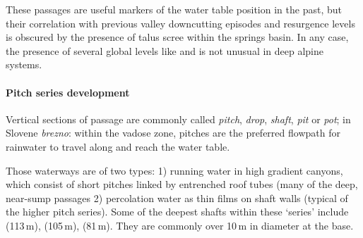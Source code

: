 These passages are useful markers of the water table position in the past, but their correlation with previous valley downcutting episodes and resurgence levels is obscured by the presence of talus scree within the  springs basin. In any case, the presence of several global levels like  and  is not unusual in deep alpine systems. 

 


\paragraph{Pitch series development}
 Vertical sections of passage are commonly called \emph{pitch}, \emph{drop}, \emph{shaft}, \emph{pit} or \emph{pot}; in Slovene \emph{brezno}: within the vadose zone, pitches are the preferred flowpath for rainwater to travel along and reach the water table.

 Those waterways are of two types: 1) running water in high gradient canyons, which consist of short pitches linked by entrenched roof tubes (many of the deep, near-sump passages 2) percolation water as thin films on shaft walls (typical of the higher pitch series). Some of the deepest shafts within these `series' include  (113\,m),  (105\,m),  (81\,m). They are commonly over 10\,m in diameter at the base. 
 
